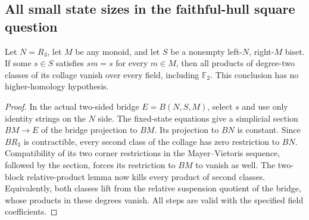 \subsection{All small state sizes in the faithful-hull square question}

\begin{lemma}
\label{CP2:A-hull-square-fixed-state}
Let $N=R_3$, let $M$ be any monoid, and let $S$ be a
nonempty left-$N$, right-$M$ biset.
If some $s\in S$ satisfies $sm=s$ for every $m\in M$,
then all products of degree-two classes of its collage
vanish over every field, including $\mathbb F_2$.
This conclusion has no higher-homology hypothesis.
\end{lemma}
\begin{proof}
In the actual two-sided bridge $E=B(N,S,M)$, select $s$
and use only identity strings on the $N$ side.
The fixed-state equations give a simplicial section
$BM\to E$ of the bridge projection to $BM$.
Its projection to $BN$ is constant.
Since $BR_3$ is contractible, every second class of the
collage has zero restriction to $BN$.
Compatibility of its two corner restrictions in the
Mayer--Vietoris sequence, followed by the section,
forces its restriction to $BM$ to vanish as well.
The two-block relative-product lemma now kills every
product of second classes.  Equivalently, both classes
lift from the relative suspension quotient of the
bridge, whose products in these degrees vanish.
All steps are valid with the specified field coefficients.
\end{proof}

